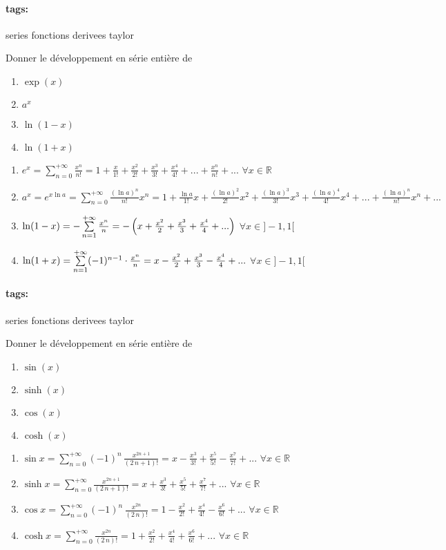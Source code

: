 \documentclass[12pt]{article}
\newcommand*{\xfield}[1]{\begin{mdframed}\centering #1\end{mdframed}\bigskip}
\newenvironment{note}{}{}
\newcommand*{\tags}[1]{\paragraph{tags: }#1}
\begin{document}
\begin{note}
	\tags{series fonctions derivees taylor}
	\xfield{Donner le développement en série entière de
	\begin{enumerate}
		\item $\exp(x)$
		\item $a^x$
		\item $\ln(1-x)$
		\item $\ln(1+x)$
	\end{enumerate}}
	\xfield{\begin{enumerate}
		\item $e^x=\sum\limits_{n=0}^{+{\infty}}{\frac{x^n}{n!}} = 1 + \frac{x}{1!} + \frac{x^2}{2!} + \frac{x^3}{3!} + \frac{x^4}{4!} + ... + \frac{x^n}{n!} + ...$ $\forall x \in \mathbb{R}$
		\item $a^x= e^{x \ln a} =\sum\limits_{n=0}^{+{\infty}}{\frac{(\ln a)^n}{n!}}x^n = 1 + \frac{\ln a}{1!}x + \frac{(\ln a )^2}{2!}x^2 + \frac{(\ln a )^3}{3!}x^3 + \frac{(\ln a )^4}{4!}x^4 + ... + \frac{(\ln a )^n}{n!}x^n + ...$
		\item $\ln (1-x)=-\sum\limits_{n=1}^{+{\infty}}{x^{n}\over{n}} = - \left( x + \frac{x^2}{2} + \frac{x^3}{3} + \frac{x^4}{4} + ...\right)$ $\forall x \in ]-1,1[$
		\item $\ln (1+x)=\sum\limits_{n=1}^{+{\infty}}(-1)^{n-1} \cdot {x^{n}\over{n}} = x - \frac{x^2}{2} + \frac{x^3}{3} - \frac{x^4}{4} + ...$  $\forall x \in ]-1,1[$
	\end{enumerate}}
\end{note}

\begin{note}
	\tags{series fonctions derivees taylor}
	\xfield{Donner le développement en série entière de
	\begin{enumerate}
	\item $\sin(x)$
	\item $\sinh(x)$
	\item $\cos(x)$
	\item $\cosh(x)$
	\end{enumerate} }
	\xfield{\begin{enumerate}
		\item $ \sin x=\sum\limits_{n=0}^{+{\infty}}(-1)^n\,{\frac{x^{2n+1}}{(2\,n+1)!}} = x - \frac{x^3}{3!} + \frac{x^5}{5!} - \frac{x^7}{7!} + ...$ $\forall x \in \mathbb{R}$
		\item $\sinh x = \sum\limits_{n=0}^{+{\infty}}{\frac{x^{2n+1}}{(2\,n+1)!}} = x + \frac{x^3}{3!} +  \frac{x^5}{5!} +  \frac{x^7}{7!} + ...$ $\forall x \in \mathbb{R}$
		\item $\cos x=\sum\limits_{n=0}^{+{\infty}}(-1)^n\,{\frac{x^{2n}}{(2\,n)!}} = 1 - \frac{x^2}{2!} +\frac{x^4}{4!} -\frac{x^6}{6!} +...$ $\forall x \in \mathbb{R}$
		\item $\cosh x = \sum\limits_{n=0}^{+{\infty}}{\frac{x^{2n}}{(2\,n)!}} = 1 +  \frac{x^2}{2!} +  \frac{x^4}{4!} + \frac{x^6}{6!} + ...$ $\forall x \in \mathbb{R}$
	\end{enumerate} }
\end{note}
\end{document}
